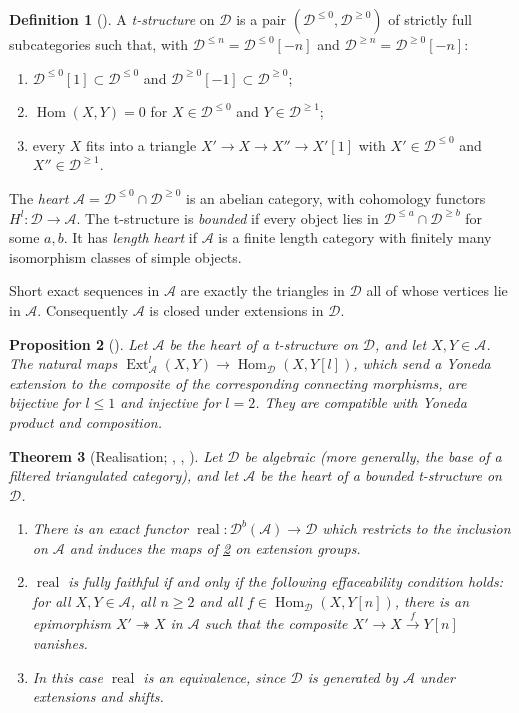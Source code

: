 \documentclass[11pt,reqno]{amsart}
\theoremstyle{plain}
\newtheorem{theorem}{Theorem}[section]
\newtheorem{proposition}[theorem]{Proposition}
\theoremstyle{definition}
\newtheorem{definition}[theorem]{Definition}
\theoremstyle{remark}
\DeclareMathOperator{\Hom}{Hom}
\DeclareMathOperator{\Ext}{Ext}
\DeclareMathOperator{\real}{real}
\newcommand{\Db}{\mathcal{D}^b}
\newcommand{\cD}{\mathcal{D}}
\newcommand{\cA}{\mathcal{A}}
\begin{document}
\begin{definition}[{\cite[D\'ef.~1.3.1]{BBD82}}]
A \emph{t-structure} on $\cD$ is a pair $(\cD^{\le0},\cD^{\ge0})$ of strictly full subcategories such that, with $\cD^{\le n}=\cD^{\le0}[-n]$ and $\cD^{\ge n}=\cD^{\ge0}[-n]$:
\begin{enumerate}
\item $\cD^{\le0}[1]\subset\cD^{\le0}$ and $\cD^{\ge0}[-1]\subset\cD^{\ge0}$;
\item $\Hom(X,Y)=0$ for $X\in\cD^{\le0}$ and $Y\in\cD^{\ge1}$;
\item every $X$ fits into a triangle $X'\to X\to X''\to X'[1]$ with $X'\in\cD^{\le0}$ and $X''\in\cD^{\ge1}$.
\end{enumerate}
The \emph{heart} $\cA=\cD^{\le0}\cap\cD^{\ge0}$ is an abelian category, with cohomology functors $H^l\colon\cD\to\cA$. The t-structure is \emph{bounded} if every object lies in $\cD^{\le a}\cap\cD^{\ge b}$ for some $a,b$. It has \emph{length heart} if $\cA$ is a finite length category with finitely many isomorphism classes of simple objects.
\end{definition}

Short exact sequences in $\cA$ are exactly the triangles in $\cD$ all of whose vertices lie in $\cA$. Consequently $\cA$ is closed under extensions in $\cD$.

\begin{proposition}[{\cite[Rem.~3.1.17]{BBD82}}]\label{prop:ext-comparison}
Let $\cA$ be the heart of a t-structure on $\cD$, and let $X,Y\in\cA$. The natural maps $\Ext^l_\cA(X,Y)\to\Hom_\cD(X,Y[l])$, which send a Yoneda extension to the composite of the corresponding connecting morphisms, are bijective for $l\le1$ and injective for $l=2$. They are compatible with Yoneda product and composition.
\end{proposition}

\begin{theorem}[{Realisation; \cite[\S3.1]{BBD82}, \cite{Bei87}, \cite{Let24}}]\label{thm:realisation}
Let $\cD$ be algebraic (more generally, the base of a filtered triangulated category), and let $\cA$ be the heart of a bounded t-structure on $\cD$.
\begin{enumerate}
\item There is an exact functor $\real\colon\Db(\cA)\to\cD$ which restricts to the inclusion on $\cA$ and induces the maps of \cref{prop:ext-comparison} on extension groups.
\item $\real$ is fully faithful if and only if the following \emph{effaceability} condition holds: for all $X,Y\in\cA$, all $n\ge2$ and all $f\in\Hom_\cD(X,Y[n])$, there is an epimorphism $X'\twoheadrightarrow X$ in $\cA$ such that the composite $X'\to X\xrightarrow{f}Y[n]$ vanishes.
\item In this case $\real$ is an equivalence, since $\cD$ is generated by $\cA$ under extensions and shifts.
\end{enumerate}
\end{theorem}
\end{document}
